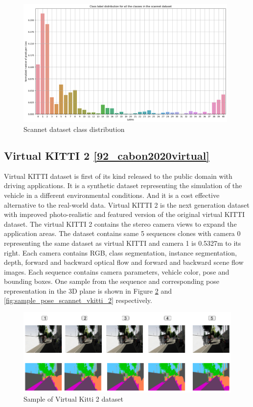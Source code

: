 	\begin{figure}
		\centering
		\includegraphics[width=11cm]{images/scannet_data_class_distribution.png}
		\caption{Scannet dataset class distribution}
		\label{fig:scannet_class_distribution}
	\end{figure}

    \subsection{Virtual KITTI 2 \ref{92_cabon2020virtual}}
    
	Virtual KITTI dataset is first of its kind released to the public domain with driving applications. It is a synthetic dataset representing the simulation of the vehicle in a different environmental conditions.  And it is a cost effective alternative to the real-world data. Virtual KITTI 2 is the next generation dataset with improved photo-realistic and featured version of the original virtual KITTI dataset. The virtual KITTI 2 contains the stereo camera views to expand the application areas. The dataset contains same 5 sequences clones with camera 0 representing the same dataset as virtual KITTI and camera 1 is 0.5327m to its right. Each camera contains RGB, class segmentation, instance segmentation, depth, forward and backward optical flow and forward and backward scene flow images. Each sequence contains camera parameters, vehicle color, pose and bounding boxes. One sample from the sequence and corresponding pose representation in the 3D plane is shown in Figure \ref{fig:sample_scannet_vkitti_2} and \ref{fig:sample_pose_scannet_vkitti_2} respectively.
	 
	\begin{figure}[h]
		\centering
		\includegraphics[width=14cm]{images/images_segm_vkitti.png}
		\caption{Sample of Virtual Kitti 2 dataset}
		\label{fig:sample_scannet_vkitti_2}
	\end{figure}

